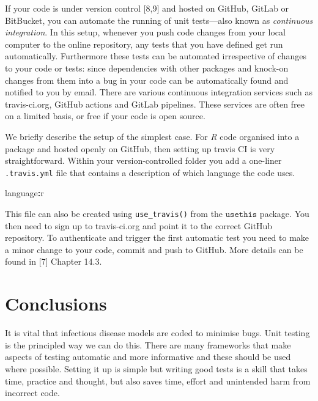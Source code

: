 \documentclass[10pt,letterpaper]{article}
\newenvironment{Shaded}{\begin{snugshade}}{\end{snugshade}}
\newcommand{\NormalTok}[1]{#1}
\newcommand{\OperatorTok}[1]{\textcolor[rgb]{0.81,0.36,0.00}{\textbf{#1}}}
\begin{document}
If your code is under version control {[}8,9{]} and hosted on GitHub, GitLab or BitBucket, you can automate the running of unit tests---also known as \emph{continuous integration}.
In this setup, whenever you push code changes from your local computer to the online repository, any tests that you have defined get run automatically.
Furthermore these tests can be automated irrespective of changes to your code or tests: since dependencies with other packages and knock-on changes from them into a bug in your code can be automatically found and notified to you by email.
There are various continuous integration services such as travis-ci.org, GitHub actions and GitLab pipelines.
These services are often free on a limited basis, or free if your code is open source.

We briefly describe the setup of the simplest case.
For \emph{R} code organised into a package and hosted openly on GitHub, then setting up travis CI is very straightforward.
Within your version-controlled folder you add a one-liner \texttt{.travis.yml} file that contains a description of which language the code uses.

\begin{Shaded}
\begin{Highlighting}[]
\NormalTok{language}\OperatorTok{:}\NormalTok{r}
\end{Highlighting}
\end{Shaded}

This file can also be created using \texttt{use\_travis()} from the \(\texttt{usethis}\) package.
You then need to sign up to travis-ci.org and point it to the correct GitHub repository.
To authenticate and trigger the first automatic test you need to make a minor change to your code, commit and push to GitHub.
More details can be found in {[}7{]} Chapter 14.3.

\hypertarget{conclusions}{%
\section{Conclusions}\label{conclusions}}

It is vital that infectious disease models are coded to minimise bugs.
Unit testing is the principled way we can do this.
There are many frameworks that make aspects of testing automatic and more informative and these should be used where possible.
Setting it up is simple but writing good tests is a skill that takes time, practice and thought, but also saves time, effort and unintended harm from incorrect code.
\end{document}
